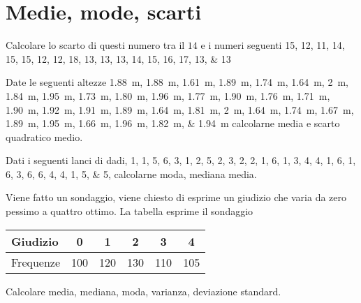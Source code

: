 \section{Medie, mode, scarti}
\begin{eser}
	Calcolare lo scarto di questi numero tra il $14$ e i numeri seguenti \numlist{15; 12; 11; 14; 15; 15; 12; 12; 18; 13; 13; 13; 14; 15; 16; 17; 13; 13}
\end{eser}
\begin{eser}
	 Date le seguenti altezze \SIlist{1.88; 1.88; 1.61; 1.89; 1.74; 1.64; 2; 1.84; 1.95; 1.73; 1.80; 1.96; 1.77; 1.90; 1.76; 1.71; 1.90;
		1.92; 1.91; 1.89; 1.64; 1.81; 2; 1.64; 1.74; 1.67; 1.89; 1.95; 1.66; 1.96; 1.82; 1.94}{\m} calcolarne media e scarto quadratico medio.
\end{eser}
\begin{eser}
Dati i seguenti lanci di dadi, \numlist{1; 1; 5; 6; 3; 1; 2; 5; 2; 3; 2; 2; 1; 6; 1; 3; 4; 4; 1; 6; 1; 6; 3; 6; 6; 4; 4; 1; 5; 5}, calcolarne moda, mediana media.
\end{eser}
\begin{eser}
	
	\item Viene fatto un sondaggio, viene chiesto di esprime un giudizio che varia da zero pessimo a quattro  ottimo. La tabella esprime il sondaggio
	\begin{center}
		\begin{tabular}{l*{5} {S[table-format=3.0]}}
			{Giudizio}	&0  &1  &2  &3&4  \\
			\midrule 
			{Frequenze}	& 100 &120  & 130 & 110&105 \\ 
		\end{tabular}
	\end{center} Calcolare media, mediana, moda, varianza, deviazione standard.
\end{eser}

